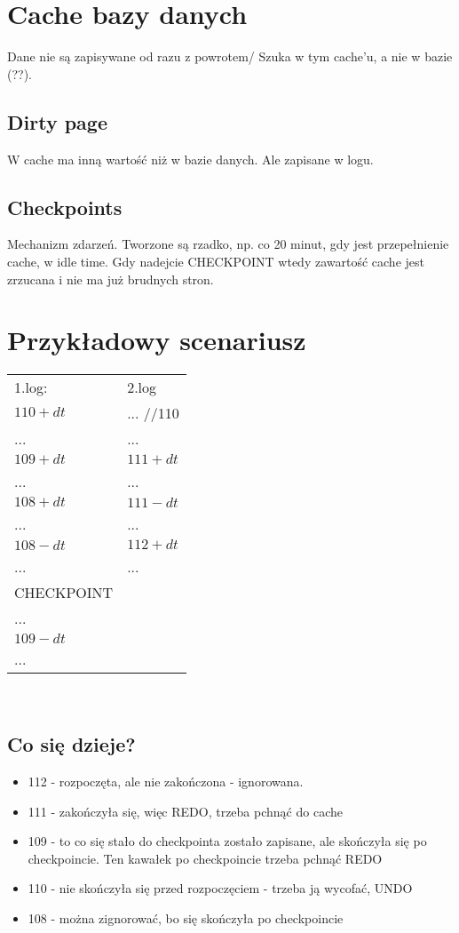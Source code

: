 \documentclass[a4paper,twoside]{article}
\begin{document}
  	\section*{Cache bazy danych}
  	Dane nie są zapisywane od razu z powrotem/ Szuka w tym cache'u, a nie w bazie (??).
  	\subsection*{Dirty page}
  	W cache ma inną wartość niż w bazie danych. Ale zapisane w logu.
  	\subsection*{Checkpoints}
  	Mechanizm zdarzeń. Tworzone są rzadko, np. co 20 minut, gdy jest przepełnienie cache, w idle time.
  	Gdy nadejcie CHECKPOINT wtedy zawartość cache jest zrzucana i nie ma już brudnych stron.
  	
  	\section*{Przykładowy scenariusz}
  	\begin{tabular}{|l|l|}
  		\hline
  		1.log: & 2.log\\
  		\(110+dt\) & ... //110\\
  		... & ...\\
  		\(109+dt\) & \(111+dt\)\\
  		... & ...\\
  		\(108+dt\) & \(111-dt\)\\
  		... & ...\\
  		\(108-dt\) & \(112+dt\)\\
  		... & ...\\
  		CHECKPOINT & \\
  		... & \\
  		\(109-dt\) & \\
  		... & \\
  		\hline
  	\end{tabular}\\
  	\subsection*{Co się dzieje?}
  	\begin{itemize}
  		\item 112 - rozpoczęta, ale nie zakończona - ignorowana.
  		\item 111 - zakończyła się, więc REDO, trzeba pchnąć do cache
  		\item 109 - to co się stało do checkpointa zostało zapisane, ale skończyła się po checkpoincie. Ten kawałek po checkpoincie trzeba pchnąć REDO
  		\item 110 - nie skończyła się przed rozpoczęciem - trzeba ją wycofać, UNDO
  		\item 108 - można zignorować, bo się skończyła po checkpoincie
  	\end{itemize}
\end{document}

